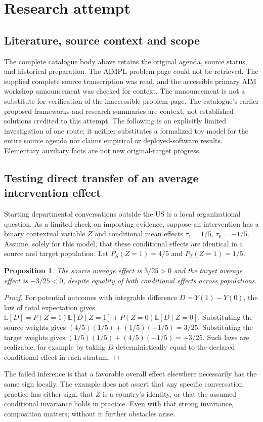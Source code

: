 \documentclass[11pt]{article}
\newtheorem{proposition}{Proposition}
\begin{document}
\section{Research attempt}
\subsection{Literature, source context and scope}
The complete catalogue body above retains the original agenda, source status, and historical preparation. The AIMPL problem page could not be retrieved. The supplied complete source transcription was read, and the accessible primary AIM workshop announcement was checked for context. The announcement is not a substitute for verification of the inaccessible problem page. The catalogue's earlier proposed frameworks and research summaries are context, not established solutions credited to this attempt. The following is an explicitly limited investigation of one route; it neither substitutes a formalized toy model for the entire source agenda nor claims empirical or deployed-software results. Elementary auxiliary facts are not new original-target progress.

\subsection{Testing direct transfer of an average intervention effect}
Starting departmental conversations outside the US is a local organizational question. As a limited check on importing evidence, suppose an intervention has a binary contextual variable $Z$ and conditional mean effects $\tau_1=1/5$, $\tau_0=-1/5$. Assume, solely for this model, that these conditional effects are identical in a source and target population. Let $P_S(Z=1)=4/5$ and $P_T(Z=1)=1/5$.
\begin{proposition}
The source average effect is $3/25>0$ and the target average effect is $-3/25<0$, despite equality of both conditional effects across populations.
\end{proposition}
\begin{proof}
For potential outcomes with integrable difference $D=Y(1)-Y(0)$, the law of total expectation gives $\mathbb E[D]=P(Z=1)\mathbb E[D\mid Z=1]+P(Z=0)\mathbb E[D\mid Z=0]$. Substituting the source weights gives $(4/5)(1/5)+(1/5)(-1/5)=3/25$. Substituting the target weights gives $(1/5)(1/5)+(4/5)(-1/5)=-3/25$. Such laws are realizable, for example by taking $D$ deterministically equal to the declared conditional effect in each stratum.
\end{proof}
The failed inference is that a favorable overall effect elsewhere necessarily has the same sign locally. The example does not assert that any specific conversation practice has either sign, that $Z$ is a country's identity, or that the assumed conditional invariance holds in practice. Even with that strong invariance, composition matters; without it further obstacles arise.
\end{document}
